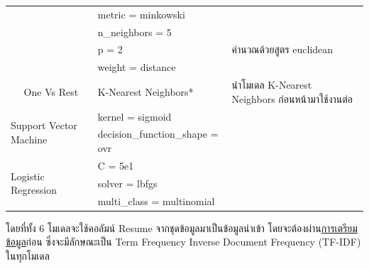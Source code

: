 \begin{table}[H]
\begin{tabularx}{\textwidth}{|l|l|X|X|}
                                                                     &                                 & metric = minkowski       &                                    \\ \cline{3-4}
                                                                     &                                 & n\_neighbors = 5         &                                    \\ \cline{3-4}
                                                                     &                                 & p = 2                    & คำนวณด้วยสูตร euclidean               \\ \cline{3-4}
                                                                     &                                 & weight = distance        &                                    \\  \cline{2-4}
                                                                     & One Vs Rest                     & K-Nearest Neighbors*             & นำโมเดล K-Nearest Neighbors ก่อนหน้ามาใช้งานต่อ \\ \hline
        \multicolumn{2}{|l|}{\multirow{2}{*}{Support Vector Machine}} & kernel = sigmoid                &                                                               \\ \cline{3-4}
        \multicolumn{2}{|l|}{}                                        & decision\_function\_shape = ovr &                                                               \\ \hline
        \multicolumn{2}{|l|}{\multirow{3}{*}{Logistic Regression}}    & C = 5e1                         &                                                               \\ \cline{3-4}
        \multicolumn{2}{|l|}{}                                        & solver = lbfgs                  &                                                               \\ \cline{3-4}
        \multicolumn{2}{|l|}{}                                        & multi\_class = multinomial      &                                                               \\ \hline
    \end{tabularx}
\end{table}

โดยที่ทั้ง 6 โมเดลจะใช้คอลัมน์ Resume จากชุดข้อมูลมาเป็นข้อมูลนำเข้า โดยจะต้องผ่าน\hyperref[subsec:Data Preparation]{การเตรียมข้อมูล}ก่อน ซึ่งจะมีลักษณะเป็น
Term Frequency Inverse Document Frequency (TF-IDF) ในทุกโมเดล

